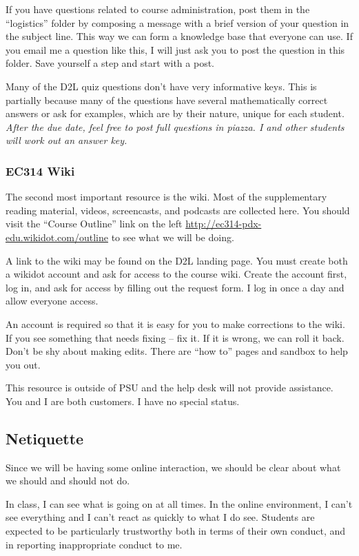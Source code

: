 \documentclass[letterpaper,10pt]{article}
\begin{document}
If you have questions related to course administration, post them in
the ``logistics'' folder by composing a message with a brief version of your question in the subject line. This way we can form a knowledge base that everyone can use.  If you email me a question like this, I will just ask you to post the question in this folder.  Save yourself a step and start with a post.

Many of the D2L quiz questions don't have very informative keys. This is partially because many of the questions have several mathematically correct answers or ask for examples, which are by their nature, unique for each student. \emph{After the due date, feel free to post full questions in piazza.  I and other students will work out an answer key.}


\subsubsection{EC314 Wiki}
The second most important resource is the wiki.  Most of the
supplementary reading material, videos, screencasts, and podcasts are
collected here. You should visit the ``Course Outline'' link on the
left \url{http://ec314-pdx-edu.wikidot.com/outline} to see what we will be
doing.

A link to the wiki may be found on the D2L landing page.  You must create both a wikidot account and ask for access to the course wiki.  Create the account first, log in, and ask for access by filling out the request form.  I log in once a day and allow everyone access.  

An account is required so that it is easy for you to make corrections to the wiki.  If you see something that needs fixing -- fix it.  If it is wrong, we can roll it back.  Don't be shy about making edits.  There are ``how to'' pages and sandbox to help you out.

This resource is outside of PSU and the help desk will not provide
assistance.  You and I are both customers. I have no special status.

\subsection{Netiquette}
Since we will be having some online interaction, we should be clear
about what we should and should not do.

In class, I can see what is going on at all times.  In the online
environment, I can't see everything and I can't react as quickly to
what I do see.  Students are expected to be particularly trustworthy
both in terms of their own conduct, and in reporting inappropriate
conduct to me.
\end{document}
